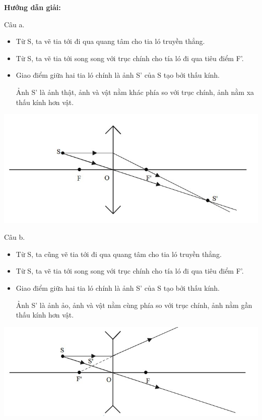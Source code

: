 {

\begin{center}
	\textbf{Hướng dẫn giải:}
\end{center}
	
	{
			Câu a. 
			\begin{itemize}
				
		\item Từ S, ta vẽ tia tới đi qua quang tâm cho tia ló truyền thẳng.
		\item Từ S, ta vẽ tia tới song song với trục chính cho tía ló đi qua tiêu điểm F'.
		\item  Giao điểm giữa hai tia ló chính là ảnh S' của S tạo bởi thấu kính.
		
		Ảnh S' là ảnh thật, ảnh và vật nằm khác phía so với trục chính, ảnh nằm xa thấu kính hơn vật.
			\end{itemize}
		\begin{center}
			\includegraphics[scale=0.7]{../figs/VN11-PH-38-A-004-1-h10.jpg}
		\end{center}
		Câu b. 
			\begin{itemize}
		\item Từ S, ta cũng vẽ tia tới đi qua quang tâm cho tia ló truyền thẳng.
		\item Từ S, ta vẽ tia tới song song với trục chính cho tía ló đi qua tiêu điểm F'.
		\item  Giao điểm giữa hai tia ló chính là ảnh S' của S tạo bởi thấu kính.
		
		Ảnh S' là ảnh ảo, ảnh và vật nằm cùng phía so với trục chính, ảnh nằm gần thấu kính hơn vật.
		
			\end{itemize}
		\begin{center}
			\includegraphics[scale=0.7]{../figs/VN11-PH-38-A-004-1-h11.jpg}
		\end{center}
			}
}
